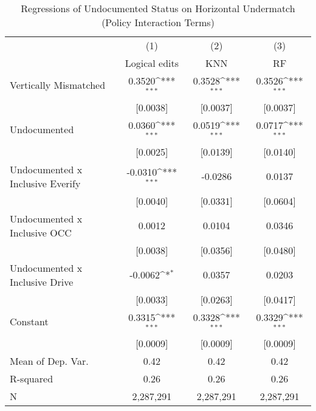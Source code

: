 \begin{table}[htbp]\centering
\def\sym#1{\ifmmode^{#1}\else\(^{#1}\)\fi}
\caption{Regressions of Undocumented Status on Horizontal Undermatch (Policy Interaction Terms)}
\begin{tabular}{l*{3}{c}}
\toprule
                    &\multicolumn{1}{c}{(1)}         &\multicolumn{1}{c}{(2)}         &\multicolumn{1}{c}{(3)}         \\
                    &Logical edits         &         KNN         &          RF         \\
\midrule
Vertically Mismatched&      0.3520\sym{***}&      0.3528\sym{***}&      0.3526\sym{***}\\
                    &    [0.0038]         &    [0.0037]         &    [0.0037]         \\
\addlinespace
Undocumented        &      0.0360\sym{***}&      0.0519\sym{***}&      0.0717\sym{***}\\
                    &    [0.0025]         &    [0.0139]         &    [0.0140]         \\
\addlinespace
Undocumented x Inclusive Everify&     -0.0310\sym{***}&     -0.0286         &      0.0137         \\
                    &    [0.0040]         &    [0.0331]         &    [0.0604]         \\
\addlinespace
Undocumented x Inclusive OCC&      0.0012         &      0.0104         &      0.0346         \\
                    &    [0.0038]         &    [0.0356]         &    [0.0480]         \\
\addlinespace
Undocumented x Inclusive Drive&     -0.0062\sym{*}  &      0.0357         &      0.0203         \\
                    &    [0.0033]         &    [0.0263]         &    [0.0417]         \\
\addlinespace
Constant            &      0.3315\sym{***}&      0.3328\sym{***}&      0.3329\sym{***}\\
                    &    [0.0009]         &    [0.0009]         &    [0.0009]         \\
\midrule
Mean of Dep. Var.   &        0.42         &        0.42         &        0.42         \\
R-squared           &        0.26         &        0.26         &        0.26         \\
N                   &   2,287,291         &   2,287,291         &   2,287,291         \\

\end{tabular}
\end{table}
